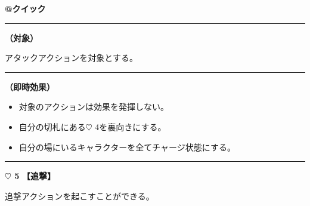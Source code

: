 \documentclass[twocolumn,a5paper,papersize,10pt]{jarticle}
\begin{document}
\begin{tcolorbox}[title={\small\bf【Action】休戦}{\scriptsize （速攻魔法）}]

{\scriptsize\bf @クイック }

\vspace{1mm} %
\hrule height 0.1mm depth 0mm width 62mm %
\vspace{1mm} %

{\bf（対象）}

アタックアクションを対象とする。

\vspace{1mm} %
\hrule height 0.1mm depth 0mm width 62mm %
\vspace{1mm} %

{\bf（即時効果）}


\vspace{-1zh}%
\begin{itemize}
\setlength{\leftskip}{-0.3cm}
\setlength{\parskip}{0pt} %

\item 対象のアクションは効果を発揮しない。

\item 自分の切札にある{\normalsize $\heartsuit$} 4を裏向きにする。

\item 自分の場にいるキャラクターを全てチャージ状態にする。
\vspace{-1zh}%
\end{itemize}

\vspace{1mm} %
\end{tcolorbox}

\vspace{-1zh}
  
 

\vspace{3mm} %
\hrule height 0.5mm depth 0mm width 66.5mm %
\vspace{1mm} %
{\Large\bf $\heartsuit$ 5} {\normalsize\bf【追撃】} %
\vspace{1mm} %

追撃アクションを起こすことができる。
\end{document}
